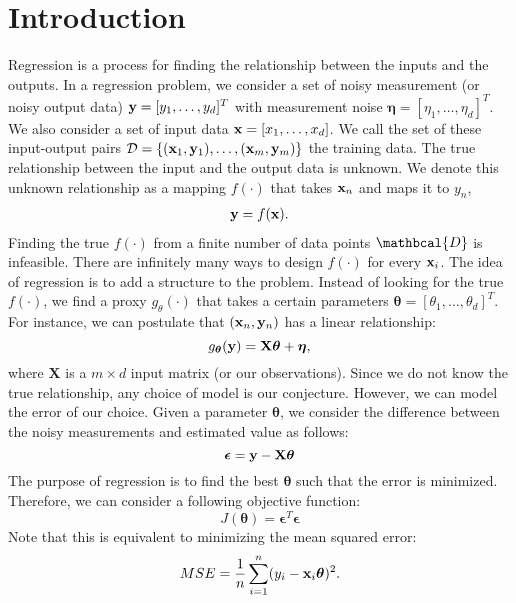 \section{Introduction}
\label{sec:regression}

Regression is a process for finding the relationship between the inputs and the outputs. In a regression problem, we consider a set of noisy measurement (or noisy output data)  ${\mathbf{y}} = [y_1, \dots, y_d]^T$ with measurement noise $\boldsymbol{\eta} = [\eta_1, \dots, \eta_d]^T$. We also consider a set of input data ${\mathbf{x}} = [x_1, \dots, x_d]$. We call the set of these input-output pairs $\mathcal{D} = \{({\mathbf{x}}_1, {\mathbf{y}}_1), \dots, ({\mathbf{x}}_m, {\mathbf{y}}_m)\}$ the training data. The true relationship between the input and the output data is unknown. We denote this unknown relationship as a mapping $f(\cdot)$ that takes ${\mathbf{x}}_n$ and maps it to $y_n$, 
\begin{align*}
	{\mathbf{y}} = f({\mathbf{x}}).
\end{align*}
Finding the true $f(\cdot)$ from a finite number of data points $\mathbcal{D}$ is infeasible. There are infinitely many ways to design $f(\cdot)$ for every ${\mathbf{x}}_i$. The idea of regression is to add a structure to the problem. Instead of looking for the true $f(\cdot)$, we find a proxy $g_\theta(\cdot)$ that takes a certain parameters $\boldsymbol{\theta} = [\theta_1,\dots,\theta_d]^T$. For instance, we can postulate that $({\mathbf{x}}_n,{\mathbf{y}}_n)$ has a linear relationship:
$$g_{\boldsymbol{\theta}}({\mathbf{y}}) = \mathbf{X}\boldsymbol{\theta}+\boldsymbol{\eta},$$
where $\mathbf{X}$ is a $m\times d$ input matrix (or our observations). Since we do not know the true relationship, any choice of model is our conjecture. However, we can model the error of our choice. Given a parameter $\boldsymbol{\theta}$, we consider the difference between the noisy measurements and estimated value as follows:
$$\boldsymbol{\epsilon} = {\mathbf{y}} - \mathbf{X}\boldsymbol{\theta}$$
The purpose of regression is to find the best $\boldsymbol{\theta}$ such that the error is minimized. Therefore, we can consider a following objective function:
$$J(\boldsymbol{\theta}) = \boldsymbol{\epsilon}^T\boldsymbol{\epsilon}$$
Note that this is equivalent to minimizing the mean squared error:
$$MSE = \frac{1}{n}\sum_{i=1}^n (y_i-{\mathbf{x}}_i\boldsymbol{\theta})^2.$$
